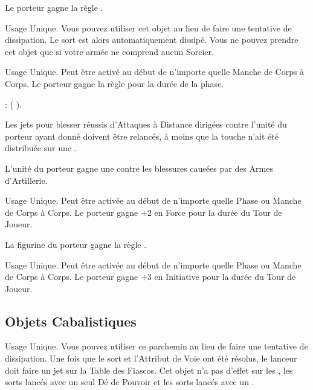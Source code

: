 Le porteur gagne la règle \lightningreflexes{}.

Usage Unique. Vous pouvez utiliser cet objet au lieu de faire une tentative de dissipation. Le sort est alors automatiquement dissipé. Vous ne pouvez prendre cet objet que si votre armée ne comprend aucun Sorcier.

Usage Unique. Peut être activé au début de n'importe quelle Manche de Corps à Corps. Le porteur gagne la règle \stubborn{} pour la durée de la phase.

 : \firesignature{} (\Pathof{} \fire{}).

\columnbreak

Les jets pour blesser réussis d'Attaques à Distance dirigées contre l'unité du porteur ayant donné  doivent être relancés, à moins que la touche n'ait été distribuée sur une \largetarget{}.

L'unité du porteur gagne une  contre les blessures causées par des Armes d'Artillerie.

Usage Unique. Peut être activée au début de n'importe quelle Phase ou Manche de Corps à Corps. Le porteur gagne +2 en Force pour la durée du Tour de Joueur.

La figurine du porteur gagne la règle \divineattacks{}.

Usage Unique. Peut être activée au début de n'importe quelle Phase ou Manche de Corps à Corps. Le porteur gagne +3 en Initiative pour la durée du Tour de Joueur.

\endpricelist

\newpage
\hypertarget{arcaneitems}{\subsection{Objets Cabalistiques}}
\label{arcane_items}

\startpricelist

Usage Unique. Vous pouvez utiliser ce parchemin au lieu de faire une tentative de dissipation. Une fois que le sort et l'Attribut de Voie ont été résolus, le lanceur doit faire un jet sur la Table des Fiascos. Cet objet n'a pas d'effet sur les \boundspells{}, les sorts lancés avec un seul Dé de Pouvoir et les sorts lancés avec un \overwhelmingpower{}.

